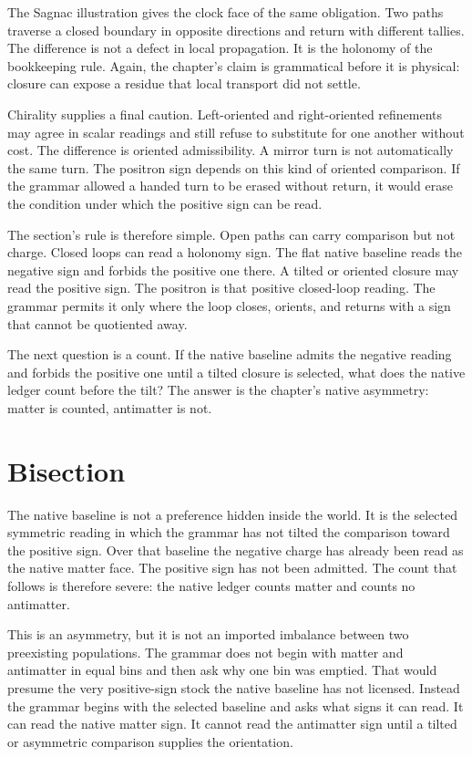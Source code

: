 The Sagnac illustration gives the clock face of the same obligation. Two
paths traverse a closed boundary in opposite directions and return with
different tallies. The difference is not a defect in local propagation. It is
the holonomy of the bookkeeping rule. Again, the chapter's claim is
grammatical before it is physical: closure can expose a residue that local
transport did not settle.

Chirality supplies a final caution. Left-oriented and right-oriented
refinements may agree in scalar readings and still refuse to substitute for
one another without cost. The difference is oriented admissibility. A mirror
turn is not automatically the same turn. The positron sign depends on this
kind of oriented comparison. If the grammar allowed a handed turn to be
erased without return, it would erase the condition under which the positive
sign can be read.

The section's rule is therefore simple. Open paths can carry comparison but
not charge. Closed loops can read a holonomy sign. The flat native baseline
reads the negative sign and forbids the positive one there. A tilted or
oriented closure may read the positive sign. The positron is that positive
closed-loop reading. The grammar permits it only where the loop closes,
orients, and returns with a sign that cannot be quotiented away.

The next question is a count. If the native baseline admits the negative
reading and forbids the positive one until a tilted closure is selected, what
does the native ledger count before the tilt? The answer is the chapter's
native asymmetry: matter is counted, antimatter is not.

\section{Bisection}

The native baseline is not a preference hidden inside the world. It is the
selected symmetric reading in which the grammar has not tilted the
comparison toward the positive sign. Over that baseline the negative charge
has already been read as the native matter face. The positive sign has not
been admitted. The count that follows is therefore severe: the native ledger
counts matter and counts no antimatter.

This is an asymmetry, but it is not an imported imbalance between two
preexisting populations. The grammar does not begin with matter and
antimatter in equal bins and then ask why one bin was emptied. That would
presume the very positive-sign stock the native baseline has not licensed.
Instead the grammar begins with the selected baseline and asks what signs it
can read. It can read the native matter sign. It cannot read the antimatter
sign until a tilted or asymmetric comparison supplies the orientation.

